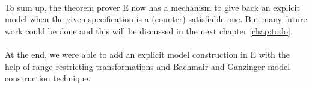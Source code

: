 \paragraph{}
To sum up, the theorem prover E now has a mechanism to give back an explicit model when the given specification is a (counter) satisfiable one. But many future work could be done and this will be discussed in the next chapter \ref{chap:todo}.

\begin{comment}
\paragraph{}
However, Something that was not tested thoroughly was the effect of termination in general for unsatisfiable \ac{epr} problems since in testing a time limit of three minutes were given to halt if it did not achieve results before it. As it was mentioned before that resolution based reasoning systems do not guarantee termination. However, The transformations guarantee termination for \ac{epr}. So this needs to be checked out without a time limit.

\paragraph{}
At the end, Minimal explicit model was given after applying the Bachmair and Ganzinger Model Construction Technique for the saturated set.

Another addition was the extension of Bachmair and Ganzinger Model Construction Technique to handle equality in \ac{epr} formulae.
\end{comment}

\paragraph{}
At the end, we were able to add an explicit model construction in E with the help of range restricting transformations and Bachmair and Ganzinger model construction technique.   